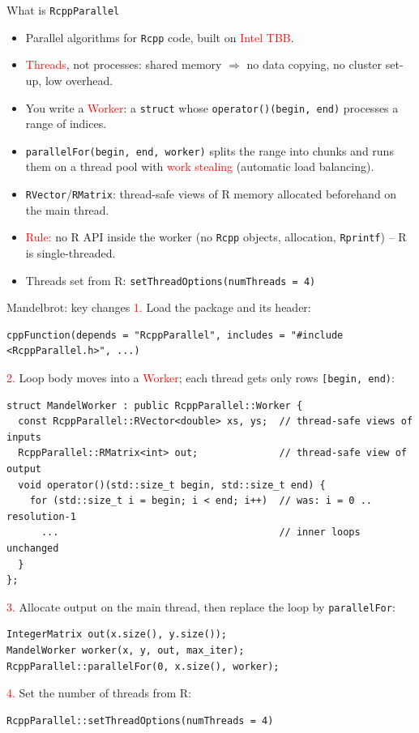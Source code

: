 \documentclass[compress,xcolor=table]{beamer}
\newcommand{\CoG}{\textcolor{red}}
\begin{document}
\begin{frame}{What is {\tt RcppParallel}}
	\small
	\begin{itemize}
		\item Parallel algorithms for {\tt Rcpp} code, built on \CoG{Intel TBB}.
		\item \CoG{Threads}, not processes: shared memory $\Rightarrow$ no data copying, no cluster set-up, low overhead.
		\item You write a \CoG{Worker}: a {\tt struct} whose {\tt operator()(begin, end)} processes a range of indices.
		\item {\tt parallelFor(begin, end, worker)} splits the range into chunks and runs them on a thread pool with \CoG{work stealing} (automatic load balancing).
		\item {\tt RVector}/{\tt RMatrix}: thread-safe views of R memory allocated beforehand on the main thread.
		\item \CoG{Rule:} no R API inside the worker (no {\tt Rcpp} objects, allocation, {\tt Rprintf}) -- R is single-threaded.
		\item Threads set from R: {\tt setThreadOptions(numThreads = 4)}
	\end{itemize}
\end{frame}


\begin{frame}[fragile]{Mandelbrot: key changes}
\vspace{-0.6em}\footnotesize
\CoG{1.} Load the package and its header:
\tiny
\begin{verbatim}
cppFunction(depends = "RcppParallel", includes = "#include <RcppParallel.h>", ...)
\end{verbatim}
\vspace{-0.6em}\footnotesize
\CoG{2.} Loop body moves into a \CoG{Worker}; each thread gets only rows {\tt [begin, end)}:
\tiny
\begin{verbatim}
struct MandelWorker : public RcppParallel::Worker {
  const RcppParallel::RVector<double> xs, ys;  // thread-safe views of inputs
  RcppParallel::RMatrix<int> out;              // thread-safe view of output
  void operator()(std::size_t begin, std::size_t end) {
    for (std::size_t i = begin; i < end; i++)  // was: i = 0 .. resolution-1
      ...                                      // inner loops unchanged
  }
};
\end{verbatim}
\vspace{-0.6em}\footnotesize
\CoG{3.} Allocate output on the main thread, then replace the loop by {\tt parallelFor}:
\tiny
\begin{verbatim}
IntegerMatrix out(x.size(), y.size());
MandelWorker worker(x, y, out, max_iter);
RcppParallel::parallelFor(0, x.size(), worker);
\end{verbatim}
\vspace{-0.6em}\footnotesize
\CoG{4.} Set the number of threads from R:
\tiny
\begin{verbatim}
RcppParallel::setThreadOptions(numThreads = 4)
\end{verbatim}
\end{frame}
\end{document}
